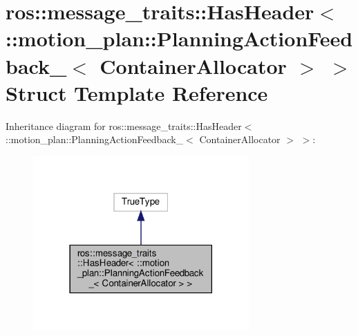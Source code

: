 \hypertarget{structros_1_1message__traits_1_1HasHeader_3_01_1_1motion__plan_1_1PlanningActionFeedback___3_01ContainerAllocator_01_4_01_4}{}\section{ros\+:\+:message\+\_\+traits\+:\+:Has\+Header$<$ \+:\+:motion\+\_\+plan\+:\+:Planning\+Action\+Feedback\+\_\+$<$ Container\+Allocator $>$ $>$ Struct Template Reference}
\label{structros_1_1message__traits_1_1HasHeader_3_01_1_1motion__plan_1_1PlanningActionFeedback___3_01ContainerAllocator_01_4_01_4}


Inheritance diagram for ros\+:\+:message\+\_\+traits\+:\+:Has\+Header$<$ \+:\+:motion\+\_\+plan\+:\+:Planning\+Action\+Feedback\+\_\+$<$ Container\+Allocator $>$ $>$\+:
\nopagebreak
\begin{figure}[H]
\begin{center}
\leavevmode
\includegraphics[width=234pt]{structros_1_1message__traits_1_1HasHeader_3_01_1_1motion__plan_1_1PlanningActionFeedback___3_01C871125e0f3397504ab5cce89a479f2c5}
\end{center}
\end{figure}


